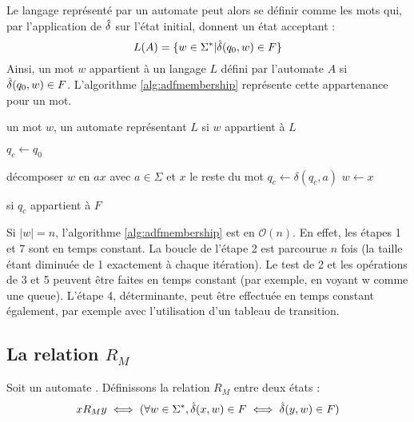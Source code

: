 	 Le langage représenté par un automate \automaton peut alors se définir comme les mots qui, par l'application de $\hat{\delta}$ sur l'état initial, donnent un état acceptant :
	 $$
	 L(A)= \{w \in \Sigma^* | \hat{\delta}(q_0,w) \in F\}
	 $$
	 Ainsi, un mot $w$ appartient à un langage $L$ défini par l'automate $A$ si $\hat{\delta}(q_0,w) \in F$. L'algorithme \ref{alg:adfmembership} représente cette appartenance pour un mot.
	 
	 
	 \begin{algo}\label{alg:adfmembership}
	 	\begin{algorithmic}[1]
	 		\REQUIRE un mot $w$, un automate \automaton représentant $L$
	 		\ENSURE si $w$ appartient à $L$
	 		
	 		\STATE $q_{c} \leftarrow q_0$ 
	 		
	 		\STATE décomposer $w$ en $ax$ avec $a\in\Sigma$ et $x$ le reste du mot
	 		\STATE $q_c \leftarrow \delta(q_c,a)$ 
	 		\STATE $w \leftarrow x$
	 		\ENDWHILE
	 		
	 		\RETURN si $q_c$ appartient à $F$
	 	\end{algorithmic}
 	\end{algo}
 
 	\begin{complexity}
 		Si $|w|=n$, l'algorithme \ref{alg:adfmembership} est en $\mathcal{O}(n)$. En effet, les étapes 1 et 7 sont en temps constant. La boucle de l'étape 2 est parcourue $n$ fois (la taille étant diminuée de 1 exactement à chaque itération). Le test de 2 et les opérations de 3 et 5 peuvent être faites en temps constant (par exemple, en voyant w comme une queue). L'étape 4, déterminante, peut être effectuée en temps constant également, par exemple avec l'utilisation d'un tableau de transition.
	
	\end{complexity}
	 
	 
	 
	 
	 \subsection{La relation $R_M$}\label{ss:rm}
	 
	 Soit un automate \automaton. Définissons la relation $R_M$ entre deux états : 
	 $$xR_My \iff (\forall w \in \Sigma^*,\hat{\delta}(x,w) \in F \iff \hat{\delta}(y,w) \in F)$$
	 

